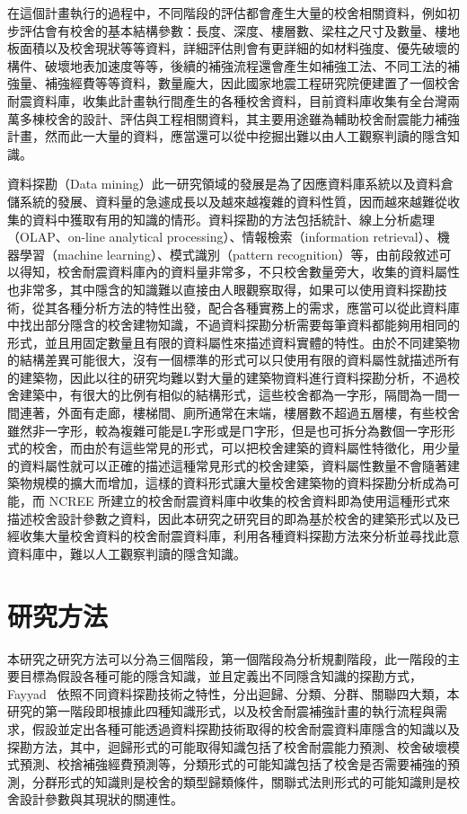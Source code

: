 在這個計畫執行的過程中，不同階段的評估都會產生大量的校舍相關資料，例如初步評估會有校舍的基本結構參數：長度、深度、樓層數、梁柱之尺寸及數量、樓地板面積以及校舍現狀等等資料，詳細評估則會有更詳細的如材料強度、優先破壞的構件、破壞地表加速度等等，後續的補強流程還會產生如補強工法、不同工法的補強量、補強經費等等資料，數量龐大，因此國家地震工程研究院便建置了一個校舍耐震資料庫，收集此計畫執行間產生的各種校舍資料，目前資料庫收集有全台灣兩萬多棟校舍的設計、評估與工程相關資料，其主要用途雖為輔助校舍耐震能力補強計畫，然而此一大量的資料，應當還可以從中挖掘出難以由人工觀察判讀的隱含知識。

資料探勘（Data mining）此一研究領域的發展是為了因應資料庫系統以及資料倉儲系統的發展、資料量的急遽成長以及越來越複雜的資料性質，因而越來越難從收集的資料中獲取有用的知識的情形。資料探勘的方法包括統計、線上分析處理（OLAP、on-line analytical processing）、情報檢索（information retrieval）、機器學習（machine learning）、模式識別（pattern recognition）等，由前段敘述可以得知，校舍耐震資料庫內的資料量非常多，不只校舍數量旁大，收集的資料屬性也非常多，其中隱含的知識難以直接由人眼觀察取得，如果可以使用資料探勘技術，從其各種分析方法的特性出發，配合各種實務上的需求，應當可以從此資料庫中找出部分隱含的校舍建物知識，不過資料探勘分析需要每筆資料都能夠用相同的形式，並且用固定數量且有限的資料屬性來描述資料實體的特性。由於不同建築物的結構差異可能很大，沒有一個標準的形式可以只使用有限的資料屬性就描述所有的建築物，因此以往的研究均難以對大量的建築物資料進行資料探勘分析，不過校舍建築中，有很大的比例有相似的結構形式，這些校舍都為一字形，隔間為一間一間連著，外面有走廊，樓梯間、廁所通常在末端，樓層數不超過五層樓，有些校舍雖然非一字形，較為複雜可能是L字形或是ㄇ字形，但是也可拆分為數個一字形形式的校舍，而由於有這些常見的形式，可以把校舍建築的資料屬性特徵化，用少量的資料屬性就可以正確的描述這種常見形式的校舍建築，資料屬性數量不會隨著建築物規模的擴大而增加，這樣的資料形式讓大量校舍建築物的資料探勘分析成為可能，而 NCREE 所建立的校舍耐震資料庫中收集的校舍資料即為使用這種形式來描述校舍設計參數之資料，因此本研究之研究目的即為基於校舍的建築形式以及已經收集大量校舍資料的校舍耐震資料庫，利用各種資料探勘方法來分析並尋找此意資料庫中，難以人工觀察判讀的隱含知識。

\section{研究方法}

本研究之研究方法可以分為三個階段，第一個階段為分析規劃階段，此一階段的主要目標為假設各種可能的隱含知識，並且定義出不同隱含知識的探勘方式，Fayyad~\cite{fayyad1996data} 依照不同資料探勘技術之特性，分出迴歸、分類、分群、關聯四大類，本研究的第一階段即根據此四種知識形式，以及校舍耐震補強計畫的執行流程與需求，假設並定出各種可能透過資料探勘技術取得的校舍耐震資料庫隱含的知識以及探勘方法，其中，迴歸形式的可能取得知識包括了校舍耐震能力預測、校舍破壞模式預測、校捨補強經費預測等，分類形式的可能知識包括了校舍是否需要補強的預測，分群形式的知識則是校舍的類型歸類條件，關聯式法則形式的可能知識則是校舍設計參數與其現狀的關連性。


